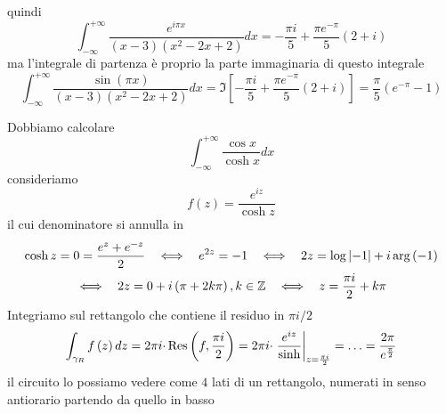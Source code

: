 quindi
\begin{equation*}
\int ^{+\infty }_{-\infty }\frac{e^{i\pi x}}{\left( x-3\right)\left( x^{2} -2x+2\right)} dx=-\frac{\pi i}{5} +\frac{\pi e^{-\pi }}{5}\left( 2+i\right)
\end{equation*}
ma l'integrale di partenza è proprio la parte immaginaria di questo integrale
\begin{equation*}
\int ^{+\infty }_{-\infty }\frac{\sin\left( \pi x\right)}{\left( x-3\right)\left( x^{2} -2x+2\right)} dx=\Im \left[ -\frac{\pi i}{5} +\frac{\pi e^{-\pi }}{5}\left( 2+i\right)\right] =\frac{\pi }{5}\left( e^{-\pi } -1\right)
\end{equation*}
\Soluzione

Dobbiamo calcolare
\begin{equation*}
\int ^{+\infty }_{-\infty }\frac{\cos x}{\cosh x} dx
\end{equation*}
consideriamo
\begin{equation*}
f\left( z\right) =\frac{e^{iz}}{\cosh z}
\end{equation*}
il cui denominatore si annulla in
\begin{gather*}
\cosh z=0=\frac{e^{z} +e^{-z}}{2} \ \ \iff \ \ e^{2z} =-1\ \ \iff \ \ 2z=\log\left| -1\right| +i\arg\left( -1\right)\\
\iff \ \ 2z=0+i\left( \pi +2k\pi \right) ,k\in \ZZ  \ \ \iff \ \ z=\frac{\pi i}{2} +k\pi 
\end{gather*}
Integriamo sul rettangolo che contiene il residuo in $\pi i/2$
\begin{equation*}
\int _{\gamma _{R}} f\left( z\right) dz=2\pi i\cdotp \operatorname{Res} \left( f,\frac{\pi i}{2}\right) =2\pi i\cdotp \left. \frac{e^{iz}}{\sinh}\right| _{z=\frac{\pi i}{2}} =\dotsc =\frac{2\pi }{e^{\frac{\pi }{2}}}
\end{equation*}
il circuito lo possiamo vedere come $4$ lati di un rettangolo, numerati in senso antiorario partendo da quello in basso


